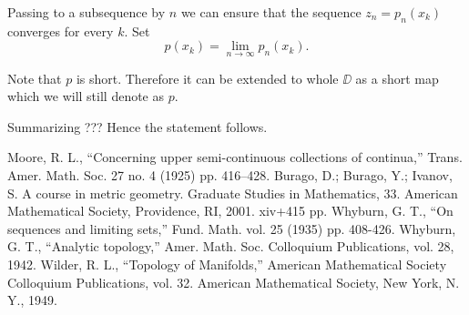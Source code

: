 \documentclass[a4paper,10pt]{amsart}
\begin{document}
Passing to a subsequence by $n$ we can ensure that the sequence
$z_n=p_n(x_k)$ converges for every $k$.
Set 
\[p(x_k)=\lim_{n\to\infty} p_n(x_k).\]

Note that $p$ is short. 
Therefore it can be extended to whole $\DD$ as a short map which we will still denote as $p$.

Summarizing ??? Hence the statement follows.\qeds


\begin{thebibliography}{52}
Moore, R. L.,
``Concerning upper semi-continuous collections of continua,''
Trans. Amer. Math. Soc. 27 no. 4 (1925) pp. 416--428.
Burago, D.; Burago, Y.; Ivanov, S.
A course in metric geometry.
Graduate Studies in Mathematics, 33. American Mathematical Society, Providence, RI, 2001. xiv+415 pp.
Whyburn, G. T., ``On sequences and limiting sets,'' Fund. Math. vol. 25 (1935) pp. 408-426.
Whyburn, G. T., ``Analytic topology,'' Amer. Math. Soc. Colloquium Publications, vol. 28, 1942.
Wilder, R. L., ``Topology of Manifolds,'' American Mathematical Society Colloquium Publications, vol. 32. American Mathematical
Society, New York, N. Y., 1949.
\end{thebibliography}
\end{document}
